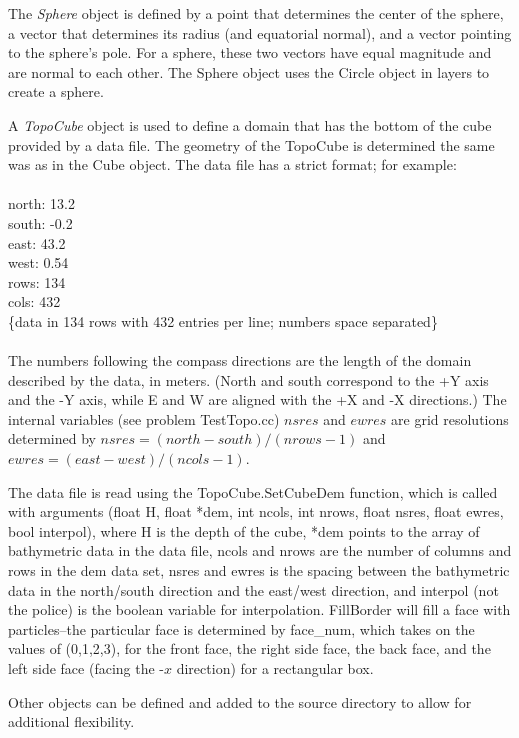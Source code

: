 The {\em Sphere} object is defined by a point that determines the center
of the sphere, a vector that determines its radius (and equatorial
normal), and a vector pointing to the sphere's pole. For a sphere,
these two vectors have equal magnitude and are normal to each other.
The Sphere object uses the Circle object in layers to create a sphere.

A {\em TopoCube} object is used to define a domain that has the bottom
of the cube provided by a data file. The geometry of the TopoCube is
determined the same was as in the Cube object. The data file has a
strict format; for example: \\\\ north: 13.2 \\ south: -0.2\\ east:
43.2 \\ west: 0.54 \\ rows: 134\\ cols: 432 \\ \{data in 134 rows
with 432 entries per line; numbers space separated\}\\ \\ The numbers
following the compass directions are the length of the domain described
by the data, in meters. (North and south correspond to the +Y axis and
the -Y axis, while E and W are aligned with the +X and -X directions.)
The internal variables (see problem TestTopo.cc) $nsres$ and $ewres$ are
grid resolutions determined by $nsres= (north-south)/(nrows-1)$ and
$ewres= (east -west)/(ncols-1)$.

The data file is read using the TopoCube.SetCubeDem function, which is
called with arguments (float H, float *dem, int ncols, int nrows, float
nsres, float ewres, bool interpol), where H is the depth of the cube,
*dem points to the array of bathymetric data in the data file, ncols and
nrows are the number of columns and rows in the dem data set, nsres and
ewres is the spacing between the bathymetric data in the north/south
direction and the east/west direction, and interpol (not the police) is
the boolean variable for interpolation. FillBorder will fill a face
with particles--the particular face is determined by face\_num, which
takes on the values of (0,1,2,3), for the front face, the right side
face, the back face, and the left side face (facing the -$x$ direction)
for a rectangular box.

Other objects can be defined and added to the source directory to allow
for additional flexibility.

